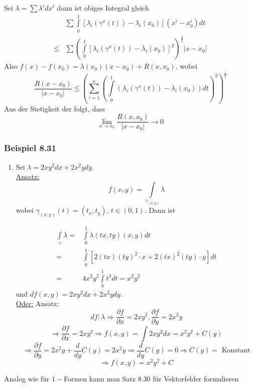 Sei $\lambda  = \sum {{\lambda ^i}d{x^i}} $ dann ist obiges Integral gleich
\begin{align*}
&\sum {\int\limits_0^1 {\left[ {{\lambda _i}\left( {{\gamma ^x}\left( t \right)} \right) - {\lambda _i}\left( {{x_0}} \right)} \right]\left( {{x^i} - x_0^i} \right)dt} }\\
 \le &\sum {{{\left( {\int\limits_0^1 {{{\left[ {{\lambda _i}\left( {{\gamma ^x}\left( t \right)} \right) - {\lambda _i}\left( {{x_0}} \right)} \right]}^2}} } \right)}^{\frac{1}{2}}}} \left| {x - {x_0}} \right|
\end{align*}
Also $f\left( x \right) - f\left( {{x_0}} \right) = \lambda \left( {{x_0}} \right)\left( {x - {x_0}} \right) + R\left( {x,{x_0}} \right)$, wobei
\[\frac{{R\left( {x - {x_0}} \right)}}{{\left| {x - {x_0}} \right|}} \le {\left( {\sum\limits_{i = 1}^n {{{\left( {\int\limits_0^1 {\left( {{\lambda _i}\left( {{\gamma ^x}\left( t \right)} \right) - {\lambda _i}\left( {{x_0}} \right)} \right)dt} } \right)}^2}} } \right)^{\frac{1}{2}}}\]
Aus der Stetigkeit der  folgt, dass
\[\mathop {\lim }\limits_{x \to {x_0}} \frac{{R\left( {x,{x_0}} \right)}}{{\left| {x - {x_0}} \right|}} \to 0\]

\subsubsection*{Beispiel 8.31}
\begin{enumerate}
\item Sei $\lambda = 2xy^2dx+2x^2ydy$. \\

\noindent\underline{Ansatz:} \[f\left(x,y\right)=\int\limits_{\gamma_{\left( x,y\right)}}\lambda\]
wobei $\gamma_{\left( x,y\right)}\left(t\right)=\left(t_x,t_y\right)$, $t\in\left( 0,1\right)$. Dann ist

\begin{align*}
\int\limits_\gamma  \lambda   = &\int\limits_0^1 {\lambda \left( {tx,ty} \right)\left( {x,y} \right)dt} \\
= &\int\limits_0^1 {\left[ {2\left( {tx} \right){{\left( {ty} \right)}^2} \cdot x + 2{{\left( {tx} \right)}^2}\left( {ty} \right) \cdot y} \right]dt} \\
= & 4{x^2}{y^2}\int\limits_0^1 {{t^3}} dt = {x^2}{y^2}
\end{align*}
und $df\left( x,y\right)=2xy^2dx+2x^2ydy$.\\

\noindent\underline{Oder:} Ansatz:
\[df:\lambda \Rightarrow\frac{\partial f}{\partial x}=  2xy^2, \frac{\partial f}{\partial y}=  2x^2y\]
\[\Rightarrow \frac{\partial f}{\partial x}=2xy^2 \Rightarrow f\left( x,y \right) = \int 2xy^2 dx =  x^2y^2+C\left( y\right)\]
\[\Rightarrow\frac{\partial f}{\partial y}=2x^2y+\frac{d}{dy}C\left(y\right)=2x^2y \Rightarrow \frac{d}{dy}C\left( y\right) =  0 \Rightarrow C\left( y\right) = \text{ Konstant}\]
\[\Rightarrow f\left( x,y\right)=  x^2y^2+C\]
\end{enumerate}
Analog wie für $1-$Formen kann man Satz 8.30 für Vektorfelder formulieren

